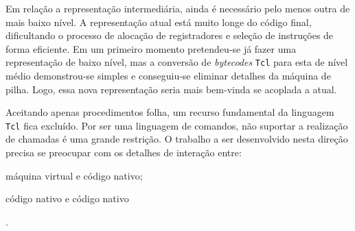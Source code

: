 Em relação a representação intermediária, ainda é necessário pelo
menos outra de mais baixo nível. A representação atual está muito
longe do código final, dificultando o processo de alocação de
registradores e seleção de instruções de forma eficiente.
Em um primeiro momento pretendeu-se já fazer uma representação de
baixo nível, mas a conversão de \textit{bytecodes} \texttt{Tcl} para
esta de nível médio demonstrou-se simples e conseguiu-se eliminar
detalhes da máquina de pilha.
Logo, essa nova representação seria mais bem-vinda  se acoplada a
atual.

Aceitando apenas procedimentos folha, um recurso fundamental da
linguagem \texttt{Tcl} fica excluído. Por ser uma linguagem de
comandos, não suportar a realização de chamadas é uma grande
restrição. O trabalho a ser desenvolvido nesta direção precisa se
preocupar com os detalhes de interação entre: \begin{inparaenum}[(1)] \item
  máquina virtual e código nativo; \item código nativo e código
  nativo\end{inparaenum}.
